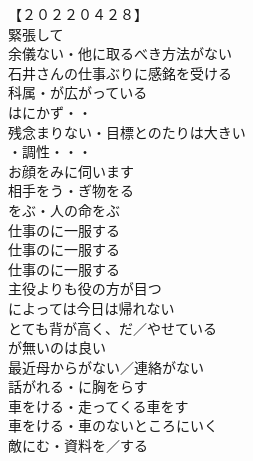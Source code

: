 \begin{multicols}{2}
【２０２２０４２８】\\
緊張して\\
余儀ない・他に取るべき方法がない\\
石井さんの仕事ぶりに感銘を受ける\\
科属・が広がっている\\
はにかず・・\\
残念まりない・目標とのたりは大きい\\
・調性・・・\\

お顔をみに伺います\\
相手をう・ぎ物をる\\
をぶ・人の命をぶ\\

仕事のに一服する\\
仕事のに一服する\\
仕事のに一服する\\
主役よりも役の方が目つ\\
によっては今日は帰れない\\
とても背が高く、だ／やせている\\

が無いのは良い\\
最近母からがない／連絡がない\\
話がれる・に胸をらす\\
車をける・走ってくる車をす\\
車をける・車のないところにいく\\
敵にむ・資料を／する\\


\end{multicols}
